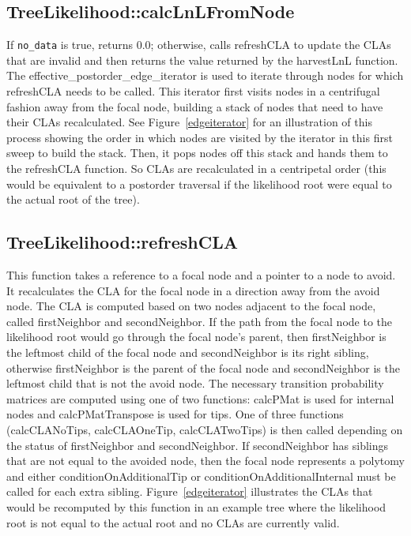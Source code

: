 \subsection{TreeLikelihood::calcLnLFromNode}
If {\tt no\_data} is true, returns 0.0; otherwise, calls refreshCLA to update the CLAs that are invalid and then returns the value returned by the harvestLnL function. The effective\_postorder\_edge\_iterator is used to iterate through nodes for which refreshCLA needs to be called. This iterator first visits nodes in a centrifugal fashion away from the focal node, building a stack of nodes that need to have their CLAs recalculated. See Figure~\ref{edgeiterator} for an illustration of this process showing the order in which nodes are visited by the iterator in this first sweep to build the stack. Then, it pops nodes off this stack and hands them to the refreshCLA function. So CLAs are recalculated in a centripetal order (this would be equivalent to a postorder traversal if the likelihood root were equal to the actual root of the tree).

\subsection{TreeLikelihood::refreshCLA}
This function takes a reference to a focal node and a pointer to a node to avoid. It recalculates the CLA for the focal node in a direction away from the avoid node. The CLA is computed based on two nodes adjacent to the focal node, called firstNeighbor and secondNeighbor. If the path from the focal node to the likelihood root would go through the focal node's parent, then firstNeighbor is the leftmost child of the focal node and secondNeighbor is its right sibling, otherwise firstNeighbor is the parent of the focal node and secondNeighbor is the leftmost child that is not the avoid node. The necessary transition probability matrices are computed using one of two functions: calcPMat is used for internal nodes and calcPMatTranspose is used for tips. One of three functions (calcCLANoTips, calcCLAOneTip, calcCLATwoTips) is then called depending on the status of firstNeighbor and secondNeighbor. If secondNeighbor has siblings that are not equal to the avoided node, then the focal node represents a polytomy and either conditionOnAdditionalTip or conditionOnAdditionalInternal must be called for each extra sibling. Figure~\ref{edgeiterator} illustrates the CLAs that would be recomputed by this function in an example tree where the likelihood root is not equal to the actual root and no CLAs are currently valid.

